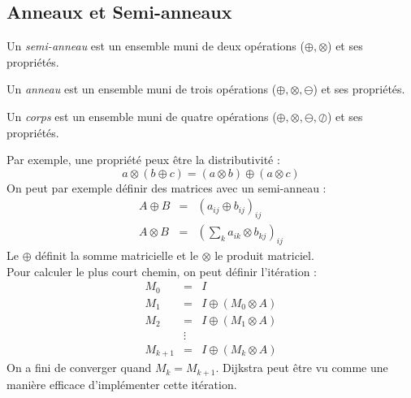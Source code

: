 \subsection{Anneaux et Semi-anneaux}
\begin{mydef}
  Un \emph{semi-anneau} est un ensemble muni de deux opérations ($\oplus,\otimes$) et ses propriétés.
\end{mydef}

\begin{mydef}
  Un \emph{anneau} est un ensemble muni de trois opérations ($\oplus,\otimes,\ominus$) et ses propriétés.
\end{mydef}

\begin{mydef}
  Un \emph{corps} est un ensemble muni de quatre opérations ($\oplus,\otimes,\ominus,\oslash$) et ses propriétés.
\end{mydef}

Par exemple, une propriété peux être la distributivité :
$$a\otimes (b \oplus c) = (a \otimes b)\oplus(a \otimes c) $$
On peut par exemple définir des matrices avec un semi-anneau :
\begin{eqnarray}
  A \oplus B &=& (a_{ij} \oplus b_{ij})_{ij}\\
  A \otimes B &=& (\sum_k a_{ik} \otimes b_{kj})_{ij}
\end{eqnarray}
Le $\oplus$ définit la somme matricielle et le $\otimes$ le produit matriciel.\\
Pour calculer le plus court chemin, on peut définir l'itération :
\begin{eqnarray}
  M_0 &=& I\\
  M_1 &=& I \oplus (M_0 \otimes A)\\
  M_2 &=& I \oplus (M_1 \otimes A)\\
   &\vdots &\\
  M_{k+1} &=& I \oplus (M_k \otimes A)
\end{eqnarray}
On a fini de converger quand $M_k = M_{k+1}$. Dijkstra peut être vu comme une manière efficace d'implémenter cette itération.
